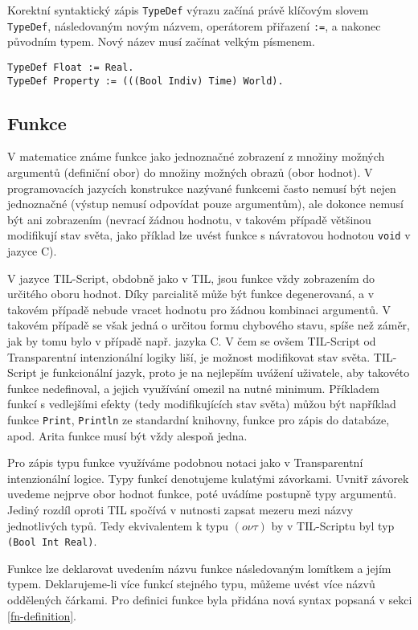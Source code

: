 Korektní syntaktický zápis \lstinline{TypeDef} výrazu začíná právě klíčovým slovem
\lstinline{TypeDef}, následovaným novým názvem, operátorem přiřazení \lstinline{:=}, a nakonec
původním typem. Nový název musí začínat velkým písmenem.

\begin{lstlisting}[caption={Výraz TypeDef}]
TypeDef Float := Real.
TypeDef Property := (((Bool Indiv) Time) World).
\end{lstlisting}

\subsection{Funkce}

V matematice známe funkce jako jednoznačné zobrazení z množiny možných argumentů (definiční obor)
do množiny možných obrazů (obor hodnot). V programovacích jazycích konstrukce nazývané funkcemi
často nemusí být nejen jednoznačné (výstup nemusí odpovídat pouze argumentům), ale dokonce nemusí
být ani zobrazením (nevrací žádnou hodnotu, v takovém případě většinou modifikují stav světa,
jako příklad lze uvést funkce s návratovou hodnotou \lstinline{void} v jazyce C).

V jazyce TIL-Script, obdobně jako v TIL, jsou funkce vždy zobrazením do určitého oboru hodnot. Díky
parcialitě může být funkce degenerovaná, a v takovém případě nebude vracet hodnotu pro žádnou
kombinaci argumentů. V takovém případě se však jedná o určitou formu chybového stavu, spíše než
záměr, jak by tomu bylo v případě např. jazyka C. V čem se ovšem TIL-Script od Transparentní
intenzionální logiky liší, je možnost modifikovat stav světa. TIL-Script je funkcionální jazyk,
proto je na nejlepším uvážení uživatele, aby takovéto funkce nedefinoval, a jejich využívání omezil
na nutné minimum. Příkladem funkcí s vedlejšími efekty (tedy modifikujících stav světa) můžou
být například funkce \lstinline{Print}, \lstinline{Println} ze standardní knihovny, funkce
pro zápis do databáze, apod. Arita funkce musí být vždy alespoň jedna.

Pro zápis typu funkce využíváme podobnou notaci jako v Transparentní intenzionální logice.
Typy funkcí denotujeme kulatými závorkami. Uvnitř závorek uvedeme nejprve obor hodnot funkce,
poté uvádíme postupně typy argumentů. Jediný rozdíl oproti TIL spočívá v nutnosti zapsat mezeru
mezi názvy jednotlivých typů. Tedy ekvivalentem k typu $(o\nu\tau)$ by v TIL-Scriptu byl typ
\lstinline{(Bool Int Real)}.

Funkce lze deklarovat uvedením názvu funkce následovaným lomítkem a jejím typem. Deklarujeme-li
více funkcí stejného typu, můžeme uvést více názvů oddělených čárkami. Pro definici funkce byla
přidána nová syntax popsaná v sekci \ref{fn-definition}.

